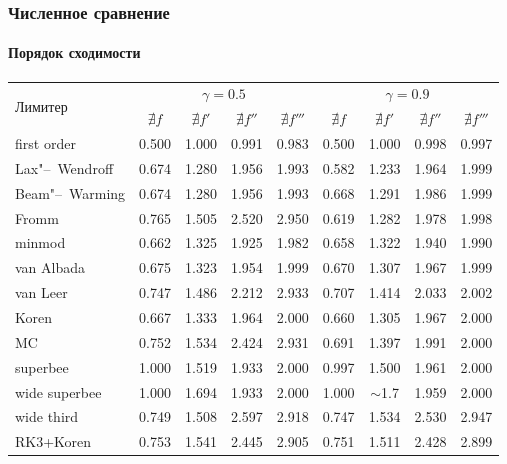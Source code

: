 \documentclass[ucs]{beamer}
\begin{document}
\begin{frame}
	\frametitle{Численное сравнение}
	\framesubtitle{Порядок сходимости}
	\scriptsize
	\begin{tabular}{|l|c|c|c|c||c|c|c|c|}
		\hline
		\multirow{2}{*}{Лимитер} & \multicolumn{4}{c||}{\(\gamma=0.5\)} & \multicolumn{4}{c|}{\(\gamma=0.9\)} \\ \cline{2-9}
		& \(\nexists f\) & \(\nexists f'\) & \(\nexists f''\) & \(\nexists f'''\) 
		& \(\nexists f\) & \(\nexists f'\) & \(\nexists f''\) & \(\nexists f'''\) \\ \hline
		first order				& 0.500 & 1.000 & 0.991 & 0.983 & 0.500 & 1.000 & 0.998 & 0.997 \\ \hline
		Lax"--~Wendroff			& 0.674 & 1.280 & 1.956 & 1.993 & 0.582 & 1.233 & 1.964 & 1.999 \\ \hline
		Beam"--~Warming			& 0.674 & 1.280 & 1.956 & 1.993 & 0.668 & 1.291 & 1.986 & 1.999 \\ \hline
		Fromm					& 0.765 & 1.505 & \color{magenta}2.520 & \color{magenta}2.950 & 0.619 & 1.282 & 1.978 & 1.998 \\ \hline
		minmod					& 0.662 & 1.325 & 1.925 & 1.982 & 0.658 & 1.322 & 1.940 & 1.990 \\ \hline
		van Albada				& 0.675 & 1.323 & 1.954 & 1.999 & 0.670 & 1.307 & 1.967 & 1.999 \\ \hline
		van Leer				& 0.747 & 1.486 & \color{magenta}2.212 & \color{magenta}2.933 & 0.707 & 1.414 & 2.033 & 2.002 \\ \hline
		Koren					& 0.667 & 1.333 & 1.964 & 2.000 & 0.660 & 1.305 & 1.967 & 2.000 \\ \hline
		MC						& 0.752 & 1.534 & \color{magenta}2.424 & \color{magenta}2.931 & 0.691 & 1.397 & 1.991 & 2.000 \\ \hline
		superbee				& \color{olive}1.000 & 1.519 & 1.933 & 2.000 & \color{olive}0.997 & 1.500 & 1.961 & 2.000 \\ \hline
		wide superbee			& \color{olive}1.000 & 1.694 & 1.933 & 2.000 & \color{olive}1.000 & \(\sim\)1.7 & 1.959 & 2.000 \\ \hline
	\color{magenta}	wide third	& 0.749 & 1.508 & \color{magenta}2.597 & \color{magenta}2.918 & 0.747 & 1.534 & \color{magenta}2.530 & \color{magenta}2.947 \\ \hline
	\color{magenta}	RK3+Koren	& 0.753 & 1.541 & \color{magenta}2.445 & \color{magenta}2.905 & 0.751 & 1.511 & \color{magenta}2.428 & \color{magenta}2.899 \\ \hline
	\end{tabular}
\end{frame}
\end{document}
